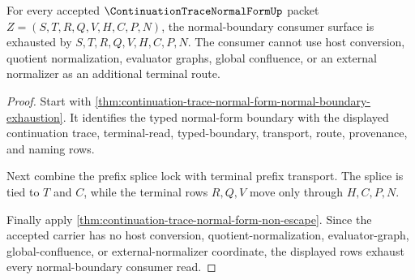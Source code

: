 \begin{theorem}
\label{thm:continuation-trace-normal-form-normal-boundary-consumer-totality}
For every accepted $\ContinuationTraceNormalFormUp$ packet $Z=(S,T,R,Q,V,H,C,P,N)$, the normal-boundary consumer surface is exhausted by $S,T,R,Q,V,H,C,P,N$. The consumer cannot use host conversion, quotient normalization, evaluator graphs, global confluence, or an external normalizer as an additional terminal route.
\end{theorem}
\begin{proof}
Start with \autoref{thm:continuation-trace-normal-form-normal-boundary-exhaustion}. It identifies the typed normal-form boundary with the displayed continuation trace, terminal-read, typed-boundary, transport, route, provenance, and naming rows.

Next combine the prefix splice lock with terminal prefix transport. The splice is tied to $T$ and $C$, while the terminal rows $R,Q,V$ move only through $H,C,P,N$.

Finally apply \autoref{thm:continuation-trace-normal-form-non-escape}. Since the accepted carrier has no host conversion, quotient-normalization, evaluator-graph, global-confluence, or external-normalizer coordinate, the displayed rows exhaust every normal-boundary consumer read.
\end{proof}


